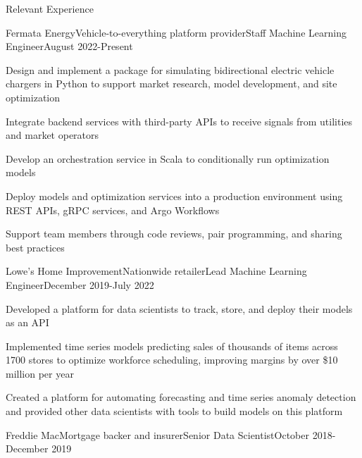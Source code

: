 \documentclass[hidelinks]{resume} %
\begin{document}
\begin{rSection}{Relevant Experience}

\begin{rSubsection}{Fermata Energy}{Vehicle-to-everything platform provider}{Staff Machine Learning Engineer}{August 2022-Present}
  \item Design and implement a package for simulating bidirectional electric vehicle chargers in Python to support market research, model development, and site optimization
  \item Integrate backend services with third-party APIs to receive signals from utilities and market operators
  \item Develop an orchestration service in Scala to conditionally run optimization models
  \item Deploy models and optimization services into a production environment using REST APIs, gRPC services, and Argo Workflows
  \item Support team members through code reviews, pair programming, and sharing best practices
\end{rSubsection}

\begin{rSubsection}{Lowe's Home Improvement}{Nationwide retailer}{Lead Machine Learning Engineer}{December 2019-July 2022}
  \item Developed a platform for data scientists to track, store, and deploy their models as an API
  \item Implemented time series models predicting sales of thousands of items across 1700 stores to optimize workforce scheduling, improving margins by over \$10 million per year
  \item Created a platform for automating forecasting and time series anomaly detection and provided other data scientists with tools to build models on this platform
\end{rSubsection}

\begin{rSubsection}{Freddie Mac}{Mortgage backer and insurer}{Senior Data Scientist}{October 2018-December 2019}
\end{rSubsection}


\end{rSection}
\end{document}
